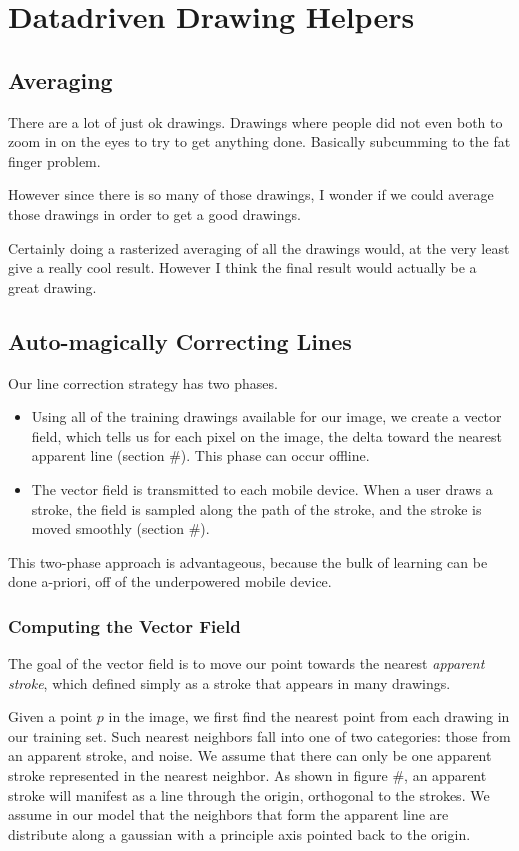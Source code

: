 \section{Datadriven Drawing Helpers}

\subsection{Averaging}
There are a lot of just ok drawings. Drawings where people did not even both to zoom in on the eyes to try to get anything done. Basically subcumming to the fat finger problem.

However since there is so many of those drawings, I wonder if we could average those drawings in order to get a good drawings.

Certainly doing a rasterized averaging of all the drawings would, at the very least give a really cool result. However I think the final result would actually be a great drawing.


\subsection{Auto-magically Correcting Lines}
Our line correction strategy has two phases.  
\begin{itemize}
\item Using all of the training drawings available for our image, we create a vector field, which tells us for each pixel on the image, the delta toward the nearest apparent line (section \#).  This phase can occur offline.
\item The vector field is transmitted to each mobile device.  When a user draws a stroke, the field is sampled along the path of the stroke, and the stroke is moved smoothly (section \#).  
\end{itemize}
This two-phase approach is advantageous, because the bulk of learning can be done a-priori, off of the underpowered mobile device.
\subsubsection{Computing the Vector Field}
The goal of the vector field is to move our point towards the nearest {\em apparent stroke}, which defined simply as a stroke that appears in many drawings.

Given a point $p$ in the image, we first find the nearest point from each drawing in our training set.  Such nearest neighbors fall into one of two categories: those from an apparent stroke, and noise.  We assume that there can only be one apparent stroke represented in the nearest neighbor.  As shown in figure \#, an apparent stroke will manifest as a line through the origin, orthogonal to the strokes.  We assume in our model that the neighbors that form the apparent line are distribute along a gaussian with a principle axis pointed back to the origin. 


